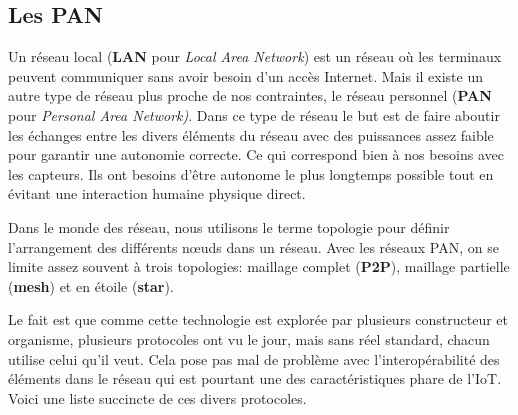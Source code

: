 
\subsection{Les PAN}

Un réseau local (\textbf{LAN} pour \textit{Local Area Network}) est un réseau où les terminaux peuvent communiquer sans avoir besoin d'un accès Internet. Mais il existe un autre type de réseau plus proche de nos contraintes, le réseau personnel (\textbf{PAN} pour \textit{Personal Area Network)}. Dans ce type de réseau le but est de faire aboutir les échanges entre les divers éléments du réseau avec des puissances assez faible pour garantir une autonomie correcte. Ce qui correspond bien à nos besoins avec les capteurs. Ils ont besoins d'être autonome le plus longtemps possible tout en évitant une interaction humaine physique direct. 

Dans le monde des réseau, nous utilisons le terme topologie pour définir l'arrangement des différents nœuds dans un réseau. Avec les réseaux PAN, on se limite assez souvent à trois topologies: maillage complet (\textbf{P2P}), maillage partielle (\textbf{mesh}) et en étoile (\textbf{star}).



Le fait est que comme cette technologie est explorée par plusieurs constructeur et organisme, plusieurs protocoles ont vu le jour, mais sans réel standard, chacun utilise celui qu'il veut. Cela pose pas mal de problème avec l'interopérabilité des éléments dans le réseau qui est pourtant une des caractéristiques phare de l'IoT. Voici une liste succincte de ces divers protocoles.
